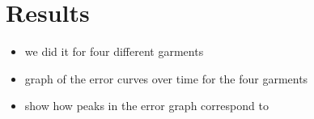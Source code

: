 \section{Results}

\begin{itemize}
\item we did it for four different garments
\item graph of the error curves over time for the four garments
\item show how peaks in the error graph correspond to
\end{itemize}
